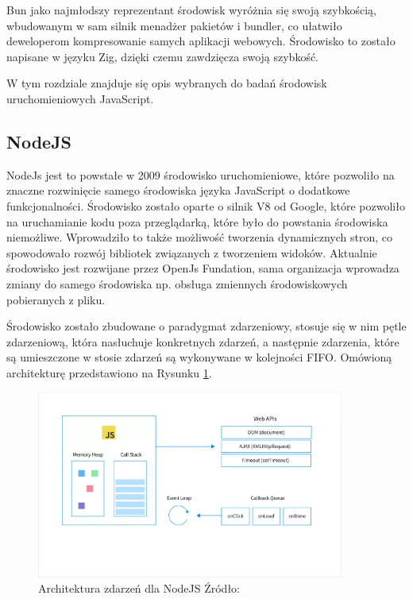 Bun jako najmłodszy reprezentant środowisk wyróżnia się swoją szybkością, wbudowanym w sam silnik menadżer pakietów i bundler, co ułatwiło deweloperom kompresowanie samych aplikacji webowych. Środowisko to zostało napisane w języku Zig, dzięki czemu zawdzięcza swoją szybkość.

W tym rozdziale znajduje się opis wybranych do badań środowisk uruchomieniowych JavaScript.

\subsection{NodeJS}
NodeJs jest to powstałe w 2009 środowisko uruchomieniowe, które pozwoliło na znaczne rozwinięcie samego środowiska języka JavaScript o dodatkowe funkcjonalności. Środowisko zostało oparte o silnik V8 od Google, które pozwoliło na uruchamianie kodu poza przeglądarką, które było do powstania środowiska niemożliwe. Wprowadziło to także możliwość tworzenia dynamicznych stron, co spowodowało rozwój bibliotek związanych z tworzeniem widoków. Aktualnie środowisko jest rozwijane przez OpenJs Fundation, sama organizacja wprowadza zmiany do samego środowiska np. obsługa zmiennych środowiskowych pobieranych z pliku.

Środowisko zostało zbudowane o paradygmat zdarzeniowy, stosuje się w nim pętle zdarzeniową, która nasłuchuje konkretnych zdarzeń, a następnie zdarzenia, które są umieszczone w stosie zdarzeń są wykonywane w kolejności FIFO. \cite{event_loop} Omówioną architekturę przedstawiono na Rysunku \ref{fig:eventLoop}.

\begin{figure}[h]
  \centering
  \includegraphics[width=0.9\textwidth]{Figures/eventLoop.png}
  \caption{Architektura zdarzeń dla NodeJS Źródło: \cite{event_loop}}
  \label{fig:eventLoop}
\end{figure}

